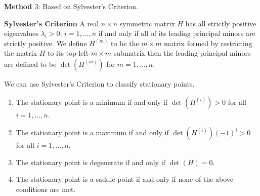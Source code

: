\documentclass[10pt, a4paper]{article}
\begin{document}
\textbf{Method $3$}:
Based on Sylvester's Criterion.

\textbf{Sylvester's Criterion}
A real $n \times n$ symmetric matrix $H$ has all strictly positive eigenvalues $\lambda_i > 0$,
$i = 1, \dotsc, n$ if and only if all of its leading principal minors are strictly positive.
We define $H ^ {(m)}$ to be the $m \times m$ matrix formed by restricting the matrix $H$ to its top-left $m \times m$ submatrix then the leading principal minors are defined to be $\det(H ^ {(m)})$ for $m = 1, \dotsc, n$.

We can use Sylvester's Criterion to classify stationary points.
\begin{enumerate}[label = (\arabic*)]
    \item The stationary point is a minimum if and only if $\det(H ^ {(i)}) > 0$ for all $i = 1, \dotsc, n$.
    
    \item The stationary point is a maximum if and only if $\det(H ^ {(i)})(-1) ^ i > 0$ for all $i = 1, \dotsc, n$.
    
    \item The stationary point is degenerate if and only if $\det(H) = 0$.

    \item The stationary point is a saddle point if and only if none of the above conditions are met.
\end{enumerate}
\end{document}
